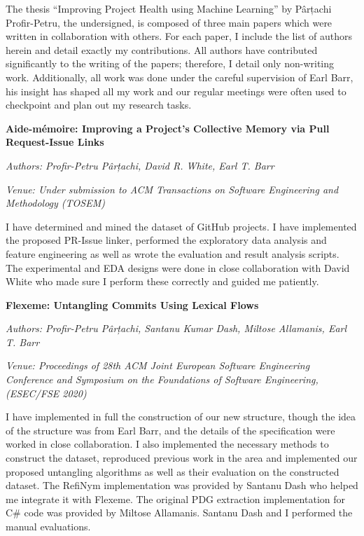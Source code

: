 \begin{conjoint}

The thesis “Improving Project Health using Machine Learning” by Pârțachi
Profir-Petru, the undersigned, is composed of three main papers which were
written in collaboration with others. For each paper, I include the list of
authors herein and detail exactly my contributions. All authors have contributed
significantly to the writing of the papers; therefore, I detail only non-writing
work. Additionally, all work was done under the careful supervision of Earl
Barr, his insight has shaped all my work and our regular meetings were often
used to checkpoint and plan out my research tasks.

\noindent\textbf{Aide-mémoire: Improving a Project’s Collective Memory via Pull
Request-Issue Links} 

\noindent\emph{Authors: Profir-Petru Pârțachi, David R. White, Earl T. Barr}

\noindent\emph{Venue: Under submission to ACM Transactions on Software
Engineering and Methodology (TOSEM)}

\noindent I have determined and mined the dataset of GitHub projects. I have
implemented the proposed PR-Issue linker, performed the exploratory data
analysis and feature engineering as well as wrote the evaluation and result
analysis scripts. The experimental and EDA designs were done in close
collaboration with David White who made sure I perform these correctly and
guided me patiently.

\noindent\textbf{Flexeme: Untangling Commits Using Lexical Flows}

\noindent\emph{Authors: Profir-Petru Pârțachi, Santanu Kumar Dash, Miltose
Allamanis, Earl T. Barr}

\noindent\emph{Venue: Proceedings of 28th ACM Joint European Software
Engineering Conference and Symposium on the Foundations of Software Engineering,
(ESEC/FSE 2020)}

\noindent  I have implemented in full the construction of our new structure,
though the idea of the structure was from Earl Barr, and the details of the
specification were worked in close collaboration. I also implemented the
necessary methods to construct the dataset, reproduced previous work in the area
and implemented our proposed untangling algorithms as well as their evaluation
on the constructed dataset. The RefiNym implementation was provided by Santanu
Dash who helped me integrate it with Flexeme. The original PDG extraction
implementation for C\# code was provided by Miltose Allamanis. Santanu Dash and
I performed the manual evaluations.


\end{conjoint}
